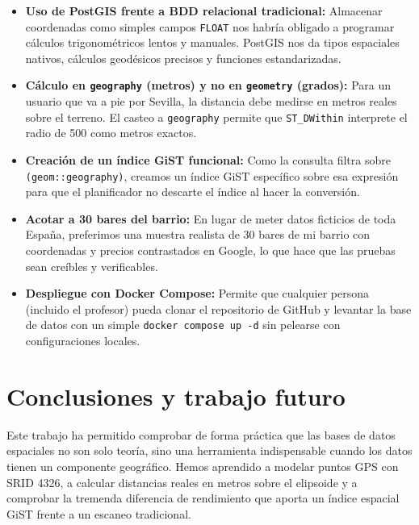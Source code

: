 \documentclass[a4paper,12pt]{article}
\begin{document}
\begin{itemize}[leftmargin=1.0cm]
  \item \textbf{Uso de PostGIS frente a BDD relacional tradicional:} Almacenar coordenadas como simples campos \texttt{FLOAT} nos habría obligado a programar cálculos trigonométricos lentos y manuales. PostGIS nos da tipos espaciales nativos, cálculos geodésicos precisos y funciones estandarizadas.
  \item \textbf{Cálculo en \texttt{geography} (metros) y no en \texttt{geometry} (grados):} Para un usuario que va a pie por Sevilla, la distancia debe medirse en metros reales sobre el terreno. El casteo a \texttt{geography} permite que \texttt{ST\_DWithin} interprete el radio de 500 como metros exactos.
  \item \textbf{Creación de un índice GiST funcional:} Como la consulta filtra sobre \texttt{(geom::geography)}, creamos un índice GiST específico sobre esa expresión para que el planificador no descarte el índice al hacer la conversión.
  \item \textbf{Acotar a 30 bares del barrio:} En lugar de meter datos ficticios de toda España, preferimos una muestra realista de 30 bares de mi barrio con coordenadas y precios contrastados en Google, lo que hace que las pruebas sean creíbles y verificables.
  \item \textbf{Despliegue con Docker Compose:} Permite que cualquier persona (incluido el profesor) pueda clonar el repositorio de GitHub y levantar la base de datos con un simple \texttt{docker compose up -d} sin pelearse con configuraciones locales.
\end{itemize}

\section{Conclusiones y trabajo futuro}

Este trabajo ha permitido comprobar de forma práctica que las bases de datos espaciales no son solo teoría, sino una herramienta indispensable cuando los datos tienen un componente geográfico. Hemos aprendido a modelar puntos GPS con SRID 4326, a calcular distancias reales en metros sobre el elipsoide y a comprobar la tremenda diferencia de rendimiento que aporta un índice espacial GiST frente a un escaneo tradicional.
\end{document}
